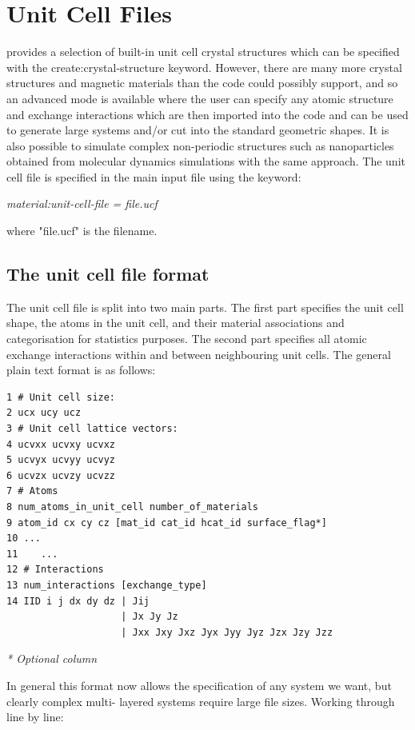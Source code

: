 \chapter{Unit Cell Files}\label{chap:unitcellfiles}
\vampire provides a selection of built-in unit cell crystal structures which can be specified with the 
create:crystal-structure keyword. However, there are many more crystal structures and magnetic materials than the code could possibly support, and so an advanced mode is available where the user can specify any atomic structure and exchange interactions which are then imported into the code and can be used to generate large systems and/or cut into the standard geometric shapes. It is also possible to simulate complex non-periodic structures such as nanoparticles obtained from molecular dynamics simulations with the same approach. The unit cell file is specified in the main input file using the keyword:

\noindent\textit{material:unit-cell-file = file.ucf}

\noindent where "file.ucf" is the filename. 

\section*{The unit cell file format}
The unit cell file is split into two main parts. The first part specifies the unit cell shape, the atoms in the unit cell, and their material associations and categorisation for statistics purposes. The second part specifies all atomic exchange interactions within and between neighbouring unit cells. The general plain text format is as follows:

\begin{verbatim}
1 # Unit cell size:
2 ucx ucy ucz
3 # Unit cell lattice vectors:
4 ucvxx ucvxy ucvxz
5 ucvyx ucvyy ucvyz
6 ucvzx ucvzy ucvzz
7 # Atoms
8 num_atoms_in_unit_cell number_of_materials
9 atom_id cx cy cz [mat_id cat_id hcat_id surface_flag*]
10 ...
11    ...
12 # Interactions
13 num_interactions [exchange_type] 
14 IID i j dx dy dz | Jij
                    | Jx Jy Jz
                    | Jxx Jxy Jxz Jyx Jyy Jyz Jzx Jzy Jzz
\end{verbatim}

\noindent\textit{* Optional column}

In general this format now allows the specification of any system we want, but clearly complex multi- layered systems require large file sizes. Working through line by line:

